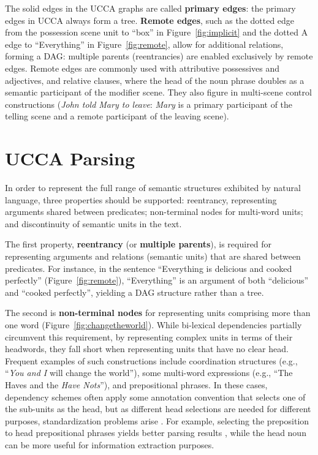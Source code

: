 \documentclass[12pt,a4paper,table]{report}
\begin{document}
The solid edges in the UCCA graphs are called \textbf{primary edges}: the primary edges in UCCA always form a tree. 
\textbf{Remote edges}, such as the dotted edge from the possession scene unit to ``box'' in Figure~\ref{fig:implicit}
and the dotted A edge to ``Everything'' in Figure~\ref{fig:remote}, allow for additional relations, forming a DAG:
multiple parents (reentrancies) are enabled exclusively by remote edges.
Remote edges are commonly used with attributive possessives and adjectives, and relative clauses, where the head of the noun phrase doubles as a semantic participant of the modifier scene. 
They also figure in multi-scene control constructions (\textit{John told Mary to leave}: \textit{Mary} is a primary participant of the telling scene and a remote participant of the leaving scene).

\section{UCCA Parsing}

In order to represent the full range of semantic structures exhibited by
natural language, three properties should be supported: reentrancy,
representing arguments shared between predicates;
non-terminal nodes for multi-word units;
and discontinuity of semantic units in the text.

The first property, \textbf{reentrancy} (or \textbf{multiple parents}), is required for
representing arguments and relations (semantic units) that are shared between predicates.
For instance, in the sentence
``Everything is delicious and cooked perfectly'' (Figure~\ref{fig:remote}),
``Everything'' is an argument of both ``delicious''
and ``cooked perfectly'', yielding a DAG structure rather than a tree.

The second is \textbf{non-terminal nodes} for representing units
comprising more than one word (Figure~\ref{fig:changetheworld}).
While bi-lexical dependencies partially circumvent this requirement, by
representing complex units in terms of their headwords, they fall short
when representing units that have no clear head.
Frequent examples of such constructions include
coordination structures (e.g., ``\textit{You and I} will change the world''),
some multi-word expressions (e.g., ``The Haves and the \textit{Have Nots}''),
and prepositional phrases.
In these cases, dependency schemes often apply some annotation convention that
selects one of the sub-units
as the head, but as different head selections are needed for different purposes,
standardization problems arise \citep{Ivanova2012who}.
For example, selecting the preposition to head prepositional phrases yields better
parsing results \citep{Schwartz:12}, while the head noun can be more useful for
information extraction purposes.
\end{document}
